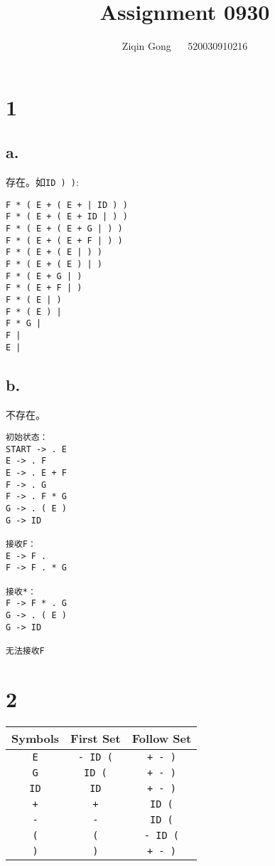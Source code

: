 \documentclass[12pt]{article}
\title{Assignment 0930}
\author{Ziqin Gong $\quad$ 520030910216}
\date{}
\begin{document}
  \maketitle

  \section*{1}

    \subsection*{a.}
     
      存在。如\texttt{ID ) )}:
      \begin{lstlisting}
F * ( E + ( E + | ID ) )
F * ( E + ( E + ID | ) )
F * ( E + ( E + G | ) )
F * ( E + ( E + F | ) )
F * ( E + ( E | ) )
F * ( E + ( E ) | )
F * ( E + G | )
F * ( E + F | )
F * ( E | )
F * ( E ) |
F * G |
F |
E |
      \end{lstlisting}

    \subsection*{b.}

      不存在。
      \begin{lstlisting}
初始状态：
START -> . E
E -> . F
E -> . E + F
F -> . G
F -> . F * G
G -> . ( E )
G -> ID

接收F：
E -> F .
F -> F . * G

接收*：
F -> F * . G
G -> . ( E )
G -> ID

无法接收F
      \end{lstlisting}

  \section*{2}
  
    \begin{table}[!htp]
      \centering
      \begin{tabular}{ccc}
      \hline
      Symbols     & First Set       & Follow Set      \\ \hline
      \texttt{E}  & \texttt{- ID (} & \texttt{+ - )}  \\
      \texttt{G}  & \texttt{ID (}   & \texttt{+ - )}  \\
      \texttt{ID} & \texttt{ID}     & \texttt{+ - )}  \\
      \texttt{+}  & \texttt{+}      & \texttt{ID (}   \\
      \texttt{-}  & \texttt{-}      & \texttt{ID (}   \\
      \texttt{(}  & \texttt{(}      & \texttt{- ID (} \\
      \texttt{)}  & \texttt{)}      & \texttt{+ - )}  \\ \hline
      \end{tabular}
    \end{table}
\end{document}
